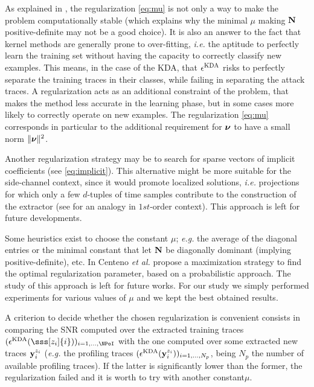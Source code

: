 As explained in \cite{scholkopf1999fisher}, the regularization \eqref{eq:mu} is not only a way to make the problem computationally stable (which explains why the minimal $\mu$ making $\textbf{N}$ positive-definite may not be a good choice). It is also an answer to the fact that kernel methods are generally prone to over-fitting, \emph{i.e.} the aptitude to perfectly learn the training set without having the capacity to correctly classify  new examples. This means, in the case of the KDA, that $\epsilon^{\mathrm{KDA}}$ risks to perfectly separate the training traces in their classes, while failing in separating the attack traces. A regularization acts as an additional constraint of the problem, that makes the method less accurate in the learning phase, but in some cases more likely to correctly operate on new examples. The regularization \eqref{eq:mu} corresponds in particular to the additional requirement for $\boldsymbol{\nu}$ to have a small norm $\lVert\boldsymbol{\nu}\rVert^2$. 

\begin{remark}
Another regularization strategy may be to search for sparse vectors of implicit coefficients (see \eqref{eq:implicit}). This alternative might be more suitable for the side-channel context, since it would promote localized solutions, \emph{i.e.} projections for which only a few $d$-tuples of time samples contribute to the construction of the extractor (see \cite{Cagli2016} for an analogy in $1st$-order context). This approach is left for future developments.
\end{remark} 



Some heuristics exist to choose the constant $\mu$; {\em e.g.} the average of the diagonal entries \cite{multiclassLDA} or the minimal constant that let $\textbf{N}$ be diagonally dominant (implying positive-definite), etc. In \cite{centeno2006optimising} Centeno \emph{et al.} propose a maximization strategy to find the optimal regularization parameter, based on a probabilistic approach. The study of this approach is left for future works. For our study we simply performed  experiments for various values of $\mu$ and we kept the best obtained results.

\begin{remark}\label{rem:mu_criteria}
A criterion to decide whether the chosen regularization is convenient consists in comparing the SNR computed over the extracted training traces $(\extract^{\mathrm{KDA}}(\sss[z_i]{i}))_{i=1,\dots,\NPoI}$ with the one computed over some extracted new traces $\textbf{y}_i^{z_i}$ (\emph{e.g.} the profiling traces $(\epsilon^{\mathrm{KDA}}(\textbf{y}^{z_i}_i))_{i=1,\dots,N_p}$, being $N_p$ the number of available profiling traces). If the latter is significantly lower than the former, the regularization failed and it is worth to try with another constant$\mu$.
\end{remark}


